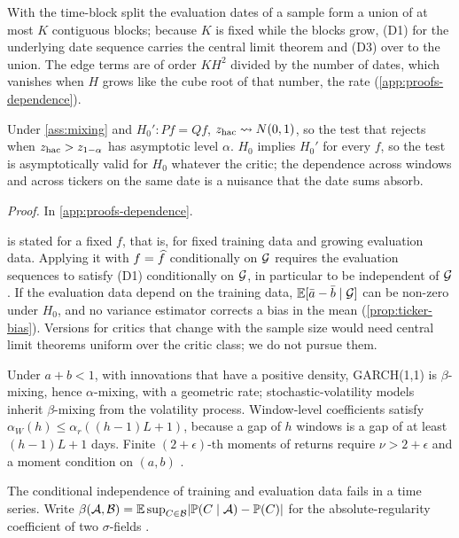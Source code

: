 With the time-block split the evaluation dates of a sample form a union of at most $K$ contiguous
blocks; because $K$ is fixed while the blocks grow, (D1) for the underlying date sequence carries
the central limit theorem and (D3) over to the union. The edge terms are of order $KH^2$ divided by
the number of dates, which vanishes when $H$ grows like the cube root of that number, the
\citet{andrews1991heteroskedasticity} rate (\cref{app:proofs-dependence}).

\begin{proposition}\label{prop:hac}
Under \cref{ass:mixing} and $H_0':Pf=Qf$, $z_{\mathrm{hac}}\rightsquigarrow N(0,1)$, so the test that rejects when
$z_{\mathrm{hac}}>z_{1-\alpha}$ has asymptotic level $\alpha$. $H_0$ implies $H_0'$ for every $f$, so the test
is asymptotically valid for $H_0$ whatever the critic; the dependence across windows and across
tickers on the same date is a nuisance that the date sums absorb.
\end{proposition}
\noindent\textit{Proof.} In \cref{app:proofs-dependence}.

 is stated for a fixed $f$, that is, for fixed training data and growing
evaluation data. Applying it with $f=\widehat{f}$ conditionally on $\mathcal{G}$ requires the evaluation
sequences to satisfy (D1) conditionally on $\mathcal{G}$, in particular to be independent of $\mathcal{G}$. If
the evaluation data depend on the training data, $\mathbb{E}[\bar a-\bar b\mid\mathcal{G}]$ can be non-zero
under $H_0$, and no variance estimator corrects a bias in the mean (\cref{prop:ticker-bias}).
Versions for critics that change with the sample size would need central limit theorems uniform
over the critic class; we do not pursue them.

\begin{fact}\label{fact:mixing}
Under $a+b<1$, with innovations that have a positive density, GARCH(1,1) is $\beta$-mixing, hence
$\alpha$-mixing, with a geometric rate; stochastic-volatility models inherit $\beta$-mixing from the
volatility process. Window-level coefficients satisfy $\alpha_W(h)\le\alpha_r((h-1)L+1)$, because a
gap of $h$ windows is a gap of at least $(h-1)L+1$ days. Finite $(2+\epsilon)$-th moments of
\GARCHt{} returns require $\nu>2+\epsilon$ and a moment condition on $(a,b)$
\citep{francq_2019_garch}.
\end{fact}

The conditional independence of training and evaluation data fails in a time series. Write
$\beta(\mathcal A,\mathcal B)=\mathbb{E}\sup_{C\in\mathcal B}\lvert\mathbb{P}(C\mid\mathcal A)-\mathbb{P}(C)\rvert$ for the
absolute-regularity coefficient of two $\sigma$-fields \citep{bradley_2005_basic}.

